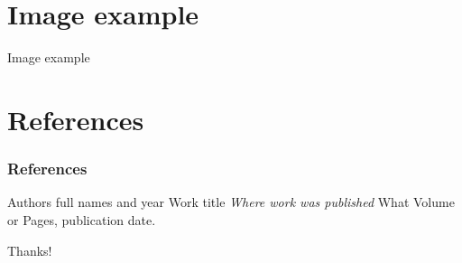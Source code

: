 \documentclass{beamer}
\begin{document}

\section{Image example}
\begin{frame}{Image example}
    \begin{figure}
        \centering
        \label{fig:1}
    \end{figure}
\end{frame}


\section{References}
\begin{frame}
    \frametitle{References}
    \footnotesize{
        \begin{thebibliography}{99} %
             Authors full names and year
            \newblock Work title
            \newblock \emph{Where work was published} What Volume or Pages, publication date.
        \end{thebibliography}
    }
\end{frame}

\begin{frame}
\Huge{\centerline{Thanks!}}
\end{frame}

\end{document}
